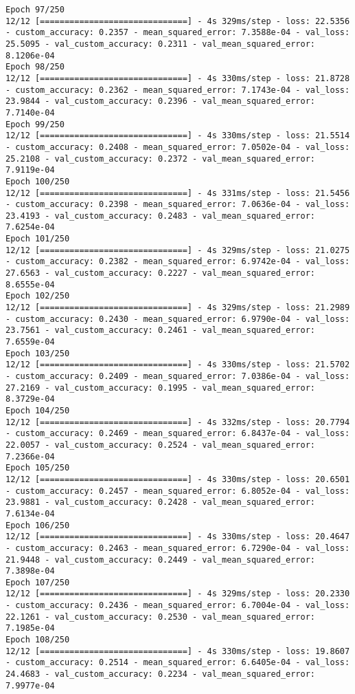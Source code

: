 \begin{lstlisting}
Epoch 97/250
12/12 [==============================] - 4s 329ms/step - loss: 22.5356 - custom_accuracy: 0.2357 - mean_squared_error: 7.3588e-04 - val_loss: 25.5095 - val_custom_accuracy: 0.2311 - val_mean_squared_error: 8.1206e-04
Epoch 98/250
12/12 [==============================] - 4s 330ms/step - loss: 21.8728 - custom_accuracy: 0.2362 - mean_squared_error: 7.1743e-04 - val_loss: 23.9844 - val_custom_accuracy: 0.2396 - val_mean_squared_error: 7.7140e-04
Epoch 99/250
12/12 [==============================] - 4s 330ms/step - loss: 21.5514 - custom_accuracy: 0.2408 - mean_squared_error: 7.0502e-04 - val_loss: 25.2108 - val_custom_accuracy: 0.2372 - val_mean_squared_error: 7.9119e-04
Epoch 100/250
12/12 [==============================] - 4s 331ms/step - loss: 21.5456 - custom_accuracy: 0.2398 - mean_squared_error: 7.0636e-04 - val_loss: 23.4193 - val_custom_accuracy: 0.2483 - val_mean_squared_error: 7.6254e-04
Epoch 101/250
12/12 [==============================] - 4s 329ms/step - loss: 21.0275 - custom_accuracy: 0.2382 - mean_squared_error: 6.9742e-04 - val_loss: 27.6563 - val_custom_accuracy: 0.2227 - val_mean_squared_error: 8.6555e-04
Epoch 102/250
12/12 [==============================] - 4s 329ms/step - loss: 21.2989 - custom_accuracy: 0.2430 - mean_squared_error: 6.9790e-04 - val_loss: 23.7561 - val_custom_accuracy: 0.2461 - val_mean_squared_error: 7.6559e-04
Epoch 103/250
12/12 [==============================] - 4s 330ms/step - loss: 21.5702 - custom_accuracy: 0.2409 - mean_squared_error: 7.0386e-04 - val_loss: 27.2169 - val_custom_accuracy: 0.1995 - val_mean_squared_error: 8.3729e-04
Epoch 104/250
12/12 [==============================] - 4s 332ms/step - loss: 20.7794 - custom_accuracy: 0.2469 - mean_squared_error: 6.8437e-04 - val_loss: 22.0057 - val_custom_accuracy: 0.2524 - val_mean_squared_error: 7.2366e-04
Epoch 105/250
12/12 [==============================] - 4s 330ms/step - loss: 20.6501 - custom_accuracy: 0.2457 - mean_squared_error: 6.8052e-04 - val_loss: 23.9881 - val_custom_accuracy: 0.2428 - val_mean_squared_error: 7.6134e-04
Epoch 106/250
12/12 [==============================] - 4s 330ms/step - loss: 20.4647 - custom_accuracy: 0.2463 - mean_squared_error: 6.7290e-04 - val_loss: 21.9448 - val_custom_accuracy: 0.2449 - val_mean_squared_error: 7.3898e-04
Epoch 107/250
12/12 [==============================] - 4s 329ms/step - loss: 20.2330 - custom_accuracy: 0.2436 - mean_squared_error: 6.7004e-04 - val_loss: 22.1261 - val_custom_accuracy: 0.2530 - val_mean_squared_error: 7.1985e-04
Epoch 108/250
12/12 [==============================] - 4s 330ms/step - loss: 19.8607 - custom_accuracy: 0.2514 - mean_squared_error: 6.6405e-04 - val_loss: 24.4683 - val_custom_accuracy: 0.2234 - val_mean_squared_error: 7.9977e-04

\end{lstlisting}
